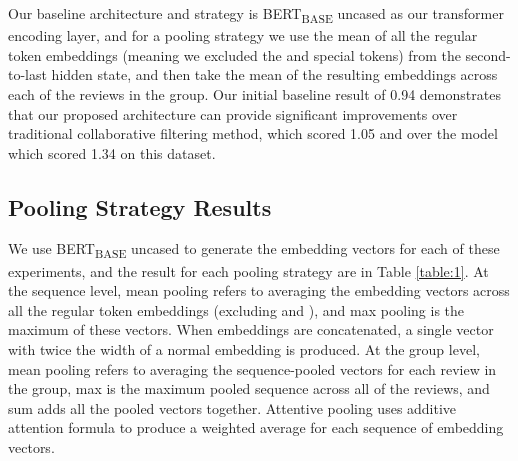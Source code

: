 \documentclass[11pt,a4paper]{article}
\begin{document}
Our baseline architecture and strategy is BERT\textsubscript{BASE} uncased as our transformer encoding layer, and for a pooling strategy we use the mean of all the regular token embeddings (meaning we excluded the {\selectfont[CLS]} and {\selectfont[SEP]} special tokens) from the second-to-last hidden state, and then take the mean of the resulting embeddings across each of the reviews in the group. Our initial baseline result of 0.94 demonstrates that our proposed architecture can provide significant improvements over traditional collaborative filtering method, which scored 1.05 and over the \citet{zheng2017joint-modeling} model which scored 1.34 on this dataset.

\subsection{Pooling Strategy Results}

We use BERT\textsubscript{BASE} uncased to generate the embedding vectors for each of these experiments, and the result for each pooling strategy are in Table \ref{table:1}.  At the sequence level, mean pooling refers to averaging the embedding vectors across all the regular token embeddings (excluding {\selectfont[CLS]} and {\selectfont[SEP]}), and max pooling is the maximum of these vectors.  When embeddings are concatenated, a single vector with twice the width of a normal embedding is produced. At the group level, mean pooling refers to averaging the sequence-pooled vectors for each review in the group, max is the maximum pooled sequence across all of the reviews, and sum adds all the pooled vectors together.  Attentive pooling uses additive attention formula \citep{bahdanau-2015} to produce a weighted average for each sequence of embedding vectors. 
\end{document}
